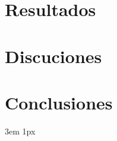 \documentclass{Academic}
\begin{document}
\section{Resultados}




\section{Discuciones}


\section{Conclusiones}


\singlespacing
\emergencystretch 3em
\hfuzz 1px
\printbibliography[heading=bibnumbered]




\end{document}
